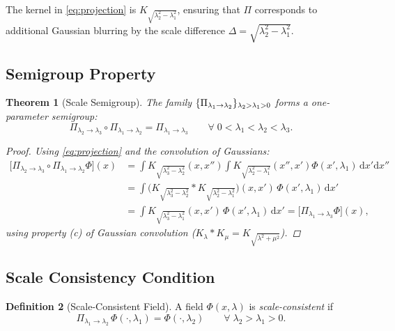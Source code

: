 \documentclass[12pt,a4paper]{article}
\theoremstyle{plain}
\newtheorem{theorem}{Theorem}[section]
\theoremstyle{definition}
\newtheorem{definition}[theorem]{Definition}
\theoremstyle{remark}
\newcommand{\dd}{\mathrm{d}}
\DeclarePairedDelimiter{\set}{\{}{\}}
\begin{document}
The kernel in \eqref{eq:projection} is $K_{\sqrt{\lambda_2^2-\lambda_1^2}}$,
ensuring that $\Pi$ corresponds to additional Gaussian blurring by the
scale difference $\Delta = \sqrt{\lambda_2^2 - \lambda_1^2}$.

\subsection{Semigroup Property}

\begin{theorem}[Scale Semigroup]
  The family $\set{\Pi_{\lambda_1 \to \lambda_2}}_{\lambda_2 > \lambda_1 > 0}$
  forms a one-parameter semigroup:
  \begin{equation}
    \Pi_{\lambda_2 \to \lambda_3} \circ \Pi_{\lambda_1 \to \lambda_2}
    = \Pi_{\lambda_1 \to \lambda_3}
    \qquad \forall\; 0 < \lambda_1 < \lambda_2 < \lambda_3.
    \label{eq:semigroup}
  \end{equation}
  \begin{proof}
    Using \eqref{eq:projection} and the convolution of Gaussians:
    \begin{align*}
      \bigl[\Pi_{\lambda_2\to\lambda_3}\circ\Pi_{\lambda_1\to\lambda_2}\Phi\bigr](x)
      &= \int K_{\sqrt{\lambda_3^2-\lambda_2^2}}(x,x'')
         \!\int K_{\sqrt{\lambda_2^2-\lambda_1^2}}(x'',x')\Phi(x',\lambda_1)
         \,\dd x'\dd x''\\
      &= \int \bigl(K_{\sqrt{\lambda_3^2-\lambda_2^2}}*K_{\sqrt{\lambda_2^2-\lambda_1^2}}\bigr)(x,x')
         \,\Phi(x',\lambda_1)\,\dd x'\\
      &= \int K_{\sqrt{\lambda_3^2-\lambda_1^2}}(x,x')\,\Phi(x',\lambda_1)\,\dd x'
      = \bigl[\Pi_{\lambda_1\to\lambda_3}\Phi\bigr](x),
    \end{align*}
    using property (c) of Gaussian convolution ($K_\lambda * K_\mu = K_{\sqrt{\lambda^2+\mu^2}}$).
  \end{proof}
\end{theorem}

\subsection{Scale Consistency Condition}

\begin{definition}[Scale-Consistent Field]
  A field $\Phi(x,\lambda)$ is \emph{scale-consistent} if
  \begin{equation}
    \Pi_{\lambda_1 \to \lambda_2}\,\Phi(\cdot, \lambda_1)
    = \Phi(\cdot, \lambda_2)
    \qquad \forall\; \lambda_2 > \lambda_1 > 0.
    \label{eq:scale_consistency}
  \end{equation}
\end{definition}
\end{document}
